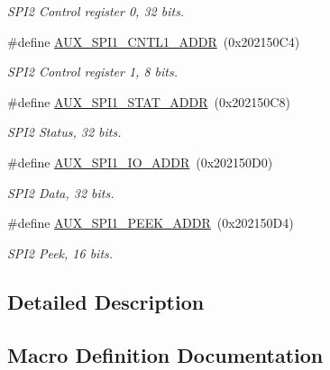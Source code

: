 \begin{DoxyCompactItemize}
\begin{DoxyCompactList}\small\item\em S\+P\+I2 Control register 0, 32 bits. \end{DoxyCompactList}\item 
\#define \hyperlink{group__SPI_ga2a714d2ba5e76210a13d3078f87fdfd5}{A\+U\+X\+\_\+\+S\+P\+I1\+\_\+\+C\+N\+T\+L1\+\_\+\+A\+D\+DR}~(0x202150\+C4)
\begin{DoxyCompactList}\small\item\em S\+P\+I2 Control register 1, 8 bits. \end{DoxyCompactList}\item 
\#define \hyperlink{group__SPI_ga35cdf7d5e580feb11441cebbf94d2c1f}{A\+U\+X\+\_\+\+S\+P\+I1\+\_\+\+S\+T\+A\+T\+\_\+\+A\+D\+DR}~(0x202150\+C8)
\begin{DoxyCompactList}\small\item\em S\+P\+I2 Status, 32 bits. \end{DoxyCompactList}\item 
\#define \hyperlink{group__SPI_ga1cb3a1149e04695c91eba8c907254d62}{A\+U\+X\+\_\+\+S\+P\+I1\+\_\+\+I\+O\+\_\+\+A\+D\+DR}~(0x202150\+D0)
\begin{DoxyCompactList}\small\item\em S\+P\+I2 Data, 32 bits. \end{DoxyCompactList}\item 
\#define \hyperlink{group__SPI_ga4f35d0db4cc890579d44879d06967f6c}{A\+U\+X\+\_\+\+S\+P\+I1\+\_\+\+P\+E\+E\+K\+\_\+\+A\+D\+DR}~(0x202150\+D4)
\begin{DoxyCompactList}\small\item\em S\+P\+I2 Peek, 16 bits. \end{DoxyCompactList}\end{DoxyCompactItemize}


\subsection{Detailed Description}


\subsection{Macro Definition Documentation}
\mbox{\label{group__SPI_gac015fcc23c0188e07727022cb742da3b}} 
